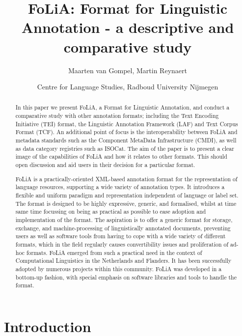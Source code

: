 \documentclass[a4paper,10pt,twoside]{article}
\title{FoLiA: Format for Linguistic Annotation - a descriptive and comparative study}
\author{Maarten van Gompel, Martin Reynaert}
\date{Centre for Language Studies, Radboud University Nijmegen}
\begin{document}
\maketitle

\begin{abstract}

In this paper we present FoLiA, a Format for Linguistic Annotation, and conduct
a comparative study with other annotation formats; including the
Text Encoding Initiative (TEI) format, the Linguistic Annotation Framework
(LAF) and Text Corpus Format (TCF). An additional point of focus is the
interoperability between FoLiA and metadata standards such as the Component
MetaData Infrastructure (CMDI), as well as data category registries such as
ISOCat. The aim of the paper is to present a clear image of the capabilities of
FoLiA and how it relates to other formats. This should open discussion and aid
users in their decision for a particular format.

FoLiA is a practically-oriented XML-based annotation format for the
representation of language resources, supporting a wide variety of annotation
types. It introduces a flexible and uniform paradigm and representation
independent of language or label set. The format is designed to be highly
expressive, generic, and formalised, whilst at time same time focussing on
being as practical as possible to ease adoption and implementation of the
format. The aspiration is to offer a generic format for storage, exchange, and
machine-processing of linguistically annotated documents, preventing users as
well as software tools from having to cope with a wide variety of different
formats, which in the field regularly causes convertibility issues and
proliferation of ad-hoc formats. FoLiA emerged from such a practical need in
the context of Computational Linguistics in the Netherlands and Flanders. It
has been successfully adopted by numerous projects within this community. FoLiA
was developed in a bottom-up fashion, with special emphasis on software
libraries and tools to handle the format.

\end{abstract}

\section{Introduction}
\end{document}
